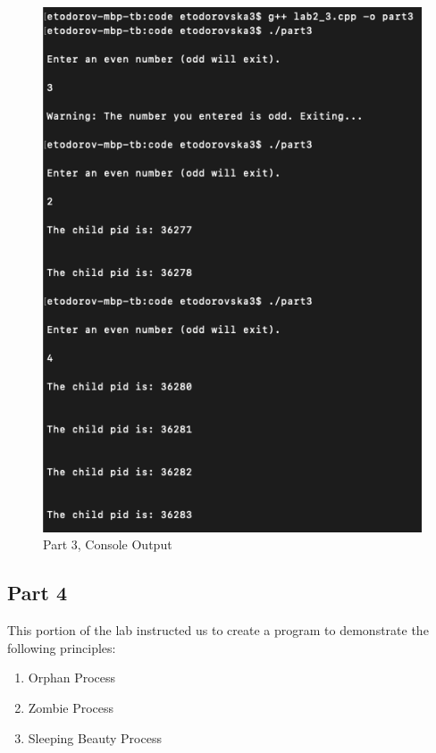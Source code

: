         \begin{figure}[H]
            \centering
            \includegraphics[width=0.75\linewidth, height=0.7\textheight]{figures/Part3Output.png}
            \caption{Part 3, Console Output}
            \label{fig:part3_output}
        \end{figure}



    \newpage
    \subsection{Part 4}\label{subsec:part4}
        This portion of the lab instructed us to create a program to demonstrate the following principles:

        \begin{enumerate}
            \itemsep0em
            \item Orphan Process
            \item Zombie Process
            \item Sleeping Beauty Process
        \end{enumerate}

